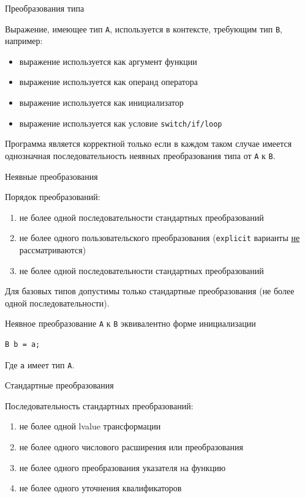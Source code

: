 \documentclass[unknownkeysallowed,xcolor=table]{beamer}
\begin{document}
\begin{frame}{Преобразования типа}

Выражение, имеющее тип \lstinline{A}, используется в контексте, требующим тип \lstinline{B}, например: \vspace{1em}
\begin{itemize}
  \item выражение используется как аргумент функции
  \item выражение используется как операнд оператора
  \item выражение используется как инициализатор
  \item выражение используется как условие \lstinline{switch/if/loop}
\end{itemize}
\vspace{1.5em}
Программа является корректной только если в каждом таком случае имеется однозначная последовательность неявных преобразования типа от \lstinline{A} к \lstinline{B}.

\end{frame}

\begin{frame}[fragile]{Неявные преобразования}

Порядок преобразований:
\begin{enumerate}
  \item не более одной последовательности стандартных преобразований
  \item не более одного пользовательского преобразования (\lstinline{explicit} варианты \underline{не} рассматриваются)
  \item не более одной последовательности стандартных преобразований
\end{enumerate}
\vspace{0.5em}
Для базовых типов допустимы только стандартные преобразования (не более одной последовательности).

Неявное преобразование \lstinline{A} к \lstinline{B} эквивалентно форме инициализации
\begin{lstlisting}
B b = a;
\end{lstlisting}
Где \lstinline{a} имеет тип \lstinline{A}.

\end{frame}

\begin{frame}{Стандартные преобразования}

Последовательность стандартных преобразований: \vspace{1.5em}
\begin{enumerate}
  \item не более одной lvalue трансформации \vspace{0.5em}
  \item не более одного числового расширения или преобразования \vspace{0.5em}
  \item не более одного преобразования указателя на функцию \vspace{0.5em}
  \item не более одного уточнения квалификаторов
\end{enumerate}

\end{frame}
\end{document}
